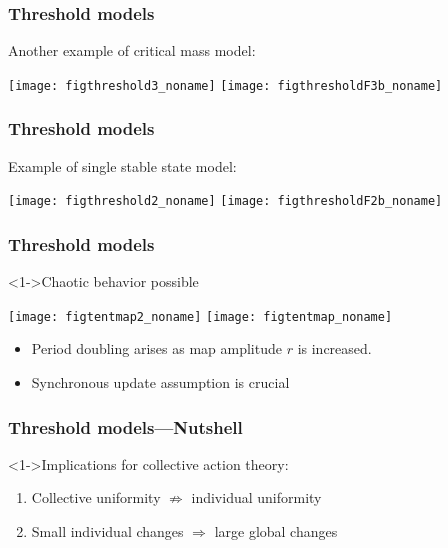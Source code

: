 \begin{frame}
   \frametitle{Threshold models}

   \begin{block}{ Another example of critical mass model:}
     \begin{center}
     \texttt{[image: figthreshold3\_noname]}
     \texttt{[image: figthresholdF3b\_noname]}
     \end{center}
   \end{block}

\end{frame}

\begin{frame}
  \frametitle{Threshold models}

  \begin{block}{Example of single stable state model:}
    \begin{center}
      \texttt{[image: figthreshold2\_noname]}
      \texttt{[image: figthresholdF2b\_noname]}
    \end{center}
  \end{block}

\end{frame}


\begin{frame}
  \frametitle{Threshold models}

  \begin{block}<1->{Chaotic behavior possible\cite{granovetter1986a,granovetter1988a}}
  \begin{center}
    \texttt{[image: figtentmap2\_noname]} 
    \texttt{[image: figtentmap\_noname]} 
  \end{center}

  \begin{itemize}
  \item<2-> Period doubling arises as map amplitude $r$ is increased.
  \item<3-> Synchronous update assumption is crucial
  \end{itemize}
  

  \end{block}

\end{frame}

\begin{frame}
  \frametitle{Threshold models---Nutshell}

  \begin{block}<1->{Implications for collective action theory:}
    \begin{enumerate}
    \item<2-> Collective uniformity $\not\Rightarrow$ individual uniformity
    \item<3-> Small individual changes $\Rightarrow$ large global changes
    \end{enumerate}
  \end{block}

\end{frame}



